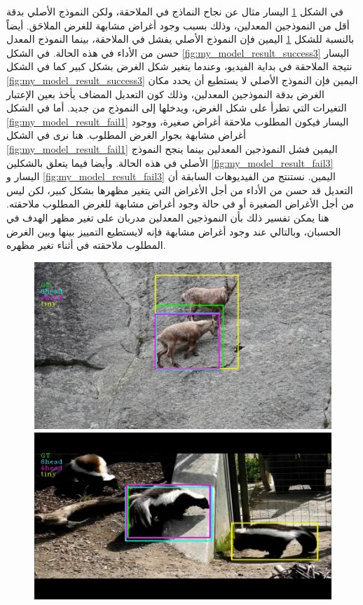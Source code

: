 في الشكل
\ref{fig:my_model_result_success1}
اليسار
مثال عن نجاح النماذج في الملاحقة، ولكن النموذج الأصلي بدقة أقل من النموذجين المعدلين، وذلك بسبب وجود أغراض مشابهة للغرض الملاحَق.
أيضاً بالنسبة للشكل
\ref{fig:my_model_result_success1}
اليمين
فإن النموذج الأصلي يفشل في الملاحقة، بينما النموذج المعدل حسن من الأداء في هذه الحالة.
\newline
في الشكل 
\ref{fig:my_model_result_success3}
اليسار
نتيجة الملاحقة في بداية الفيديو، وعندما يتغير شكل الغرض بشكل كبير كما في الشكل 
\ref{fig:my_model_result_success3}
اليمين
فإن النموذج الأصلي لا يستطيع أن يحدد مكان الغرض بدقة النموذجين المعدلين، وذلك كون التعديل المضاف يأخذ بعين الإعتبار التغيرات التي تطرأ على شكل الغرض، ويدخلها إلى النموذج من جديد.
\newline
أما في الشكل
	\ref{fig:my_model_result_fail1}
	اليسار
	فيكون المطلوب ملاحقة أغراض صغيرة، ووجود أغراض مشابهة بجوار الغرض المطلوب.
	هنا نرى في الشكل 
	\ref{fig:my_model_result_fail1}
	اليمين
	فشل النموذجين المعدلين بينما ينجح النموذج الأصلي في هذه الحالة.
	وأيضا فيما يتعلق بالشكلين
	\ref{fig:my_model_result_fail3}
	اليسار
		و
	\ref{fig:my_model_result_fail3}
	اليمين.
	\newline
	نستنتج من الفيديوهات السابقة أن التعديل قد حسن من الأداء من أجل الأغراض التي يتغير مظهرها بشكل كبير، لكن ليس من أجل الأغراض الصغيرة أو في حالة وجود أغراض مشابهة للغرض المطلوب ملاحقته.
	هنا يمكن تفسير ذلك بأن النموذجين المعدلين مدربان على تغير مظهر الهدف في الحسبان، وبالتالي عند وجود أغراض مشابهة فإنه لايستطيع التمييز بينها وبين الغرض المطلوب ملاحقته في أثناء تغير مظهره.
\begin{figure}[H]
	\centerline{
	\includegraphics[width=0.5\linewidth]{images/results/success/project_52}
	\quad
	\includegraphics[width=0.5\linewidth]{images/results/success/project_161}}
	\caption{\textRL{}}
	\label{fig:my_model_result_success1}
\end{figure}

